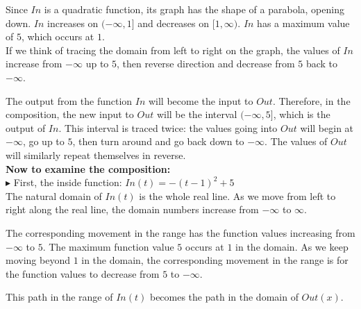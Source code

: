 \documentclass{ximera}
\begin{document}
Since $In$ is a quadratic function, its graph has the shape of a parabola, opening down.  $In$ increases on $(-\infty, 1]$ and decreases on $[1, \infty)$. $In$ has a maximum value of $5$, which occurs at $1$. \\

If we think of tracing the domain from left to right on the graph, the values of $In$ increase from $-\infty$ up to $5$, then reverse direction and decrease from $5$ back to $-\infty$.


The output from the function $In$ will become the input to $Out$.  Therefore, in the composition, the new input to $Out$ will be the interval $(-\infty, 5]$, which is the output of $In$. This interval is traced twice: the values going into $Out$ will begin at $-\infty$, go up to $5$, then turn around and go back down to $-\infty$. The values of $Out$ will similarly repeat themselves in reverse.\\






\textbf{\textcolor{purple!85!blue}{Now to examine the composition:}} \\



\textbf{\textcolor{blue!75!black}{$\blacktriangleright$}}   First, the inside function: $In(t) = -(t-1)^2 + 5$ \\

The natural domain of $In(t)$ is the whole real line. As we move from left to right along the real line, the domain numbers increase from $-\infty$ to $\infty$.

The corresponding movement in the range has the function values increasing from $-\infty$ to $5$.  The maximum function value $5$ occurs at $1$ in the domain.  As we keep moving beyond $1$ in the domain, the corresponding movement in the range is for the function values to decrease from $5$ to $-\infty$.


This path in the range of $In(t)$ becomes the path in the domain of $Out(x)$. \\
\end{document}
